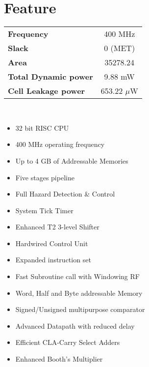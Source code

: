 \chapter{Feature}
\begin{center}

\vfill
\begin{tabular}{ l c }
	\textbf{Frequency} & 400 MHz \\ 
	\textbf{Slack} & 0 (MET) \\  
	\textbf{Area} & 35278.24 \\  
	\textbf{Total Dynamic power} & 9.88 mW \\  
	\textbf{Cell Leakage power} & 653.22 $\mu$W
\end{tabular}

\end{center}
\hfill
\\[60pt]
\hfill

\begin{multicols}{2}
\begin{itemize}
\item 32 bit RISC CPU
\item 400 MHz operating frequency
\item Up to 4 GB of Addressable Memories
\item Five stages pipeline
\item Full Hazard Detection \& Control
\item System Tick Timer
\item Enhanced T2 3-level Shifter
\item Hardwired Control Unit
\end{itemize}

\columnbreak

\begin{itemize}
\item Expanded instruction set
\item Fast Subroutine call with Windowing RF
\item Word, Half and Byte addressable Memory
\item Signed/Unsigned multipurpose comparator
\item Advanced Datapath with reduced delay
\item Efficient CLA-Carry Select Adders
\item Enhanced Booth's Multiplier
\end{itemize}
\end{multicols}
\vfill